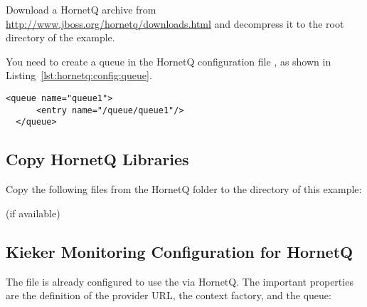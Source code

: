Download a HornetQ archive from \url{http://www.jboss.org/hornetq/downloads.html} %
and decompress it to the root directory of the example. 

\noindent You need to create a queue in the HornetQ configuration file %
, as shown in Listing~\ref{lst:hornetq:config:queue}.

\setXMLListing
\begin{lstlisting}[caption=Queue definition to be added to the HornetQ configuration file,label=lst:hornetq:config:queue,numbers=none]
  <queue name="queue1">
      <entry name="/queue/queue1"/>
  </queue>
\end{lstlisting}

\subsection{Copy HornetQ Libraries}

Copy the following files from the HornetQ  folder to the %
 directory of this example:

\medskip

\begin{compactenum}
\item {}
\item {} (if available)
\item {}
\item {}
\item {}
\item {}
\end{compactenum}

\subsection{Kieker Monitoring Configuration for HornetQ}

The file  %
is already configured to use the  via HornetQ. The important properties are %
the definition of the provider URL, the context factory, and the queue:

\setPropertiesListing


